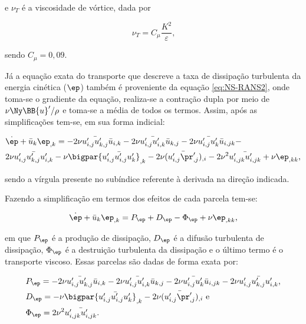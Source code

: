 \noindent e $\nu_T$ é a viscosidade de vórtice, dada por

\begin{equation}
    \nu_T=C_\mu\frac{K^2}{\varepsilon}\text{,}
\end{equation}

\noindent sendo $C_\mu=0,09$.

Já a equação exata do transporte que descreve a taxa de dissipação turbulenta da energia cinética ($\ep$) também é proveniente da equação \eqref{eq:NS-RANS2}, onde toma-se o gradiente da equação, realiza-se a contração dupla por meio de $\nu\Ny\BB{u}'/\rho$ e toma-se a média de todos os termos. Assim, após as simplificações tem-se, em sua forma indicial:

\begin{equation}
    \begin{split}
        &\dot{\ep}+\bar{u}_k\ep_{,k}=-2\nu\bar{u'_{i,j}u'_{k,j}}\bar{u}_{i,k}-2\nu\bar{u'_{i,j}u'_{i,k}}\bar{u}_{k,j}-2\nu\bar{u'_{i,j}u'_k}\bar{u}_{i,jk}-\\
        &2\nu\bar{u'_{i,j}u'_{k,j}u'_{i,k}}-\nu\bigpar{\bar{u'_{i,j}u'_{i,j}u'_k}}_{,k}-2\nu(\bar{u'_{i,j}\pr'_{,j}})_{,i}-2\nu^2\bar{u'_{i,jk}u'_{i,jk}}+\nu\ep_{,kk}\text{,}
    \end{split}
\end{equation}

\noindent sendo a vírgula presente no subíndice referente à derivada na direção indicada.

Fazendo a simplificação em termos dos efeitos de cada parcela tem-se:

\begin{equation}
    \dot{\ep}+\bar{u}_k\ep_{,k}=P_\ep+D_\ep-\Phi_\ep+\nu\ep_{,kk}\text{,}
\end{equation}

\noindent em que $P_\ep$ é a produção de dissipação, $D_\ep$ é a difusão turbulenta de dissipação, $\Phi_\ep$ é a destruição turbulenta da dissipação e o último termo é o transporte viscoso. Essas parcelas são dadas de forma exata por:

\begin{subequations}
    \begin{align}
         & P_\ep=-2\nu\bar{u'_{i,j}u'_{k,j}}\bar{u}_{i,k}-2\nu\bar{u'_{i,j}u'_{i,k}}\bar{u}_{k,j}-2\nu\bar{u'_{i,j}u'_k}\bar{u}_{i,jk}-2\nu\bar{u'_{i,j}u'_{k,j}u'_{i,k}} \text{,} \\
         & D_\ep=-\nu\bigpar{\bar{u'_{i,j}u'_{i,j}u'_k}}_{,k}-2\nu(\bar{u'_{i,j}\pr'_{,j}})_{,i} \text{ e}                                                                         \\
         & \Phi_\ep=2\nu^2\bar{u'_{i,jk}u'_{i,jk}}\text{.}
    \end{align}
\end{subequations}

